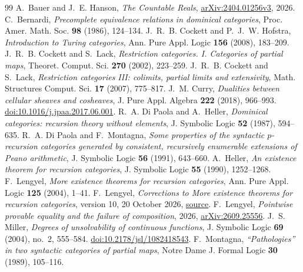 \documentclass[11pt]{article}
\theoremstyle{definition}\newtheorem{definition}[theorem]{Definition}
\begin{document}
\begin{thebibliography}{99}
\small
{}
A.~Bauer and J.~E. Hanson, \emph{The Countable Reals},
\href{https://arxiv.org/abs/2404.01256v3}{arXiv:2404.01256v3}, 2026.
C.~Bernardi, \emph{Precomplete equivalence relations in dominical
categories}, Proc. Amer. Math. Soc. \textbf{98} (1986), 124--134.
J.~R.~B. Cockett and P.~J.~W. Hofstra,
\emph{Introduction to Turing categories},
Ann. Pure Appl. Logic \textbf{156} (2008), 183--209.
J.~R.~B. Cockett and S.~Lack, \emph{Restriction categories. I.
Categories of partial maps}, Theoret. Comput. Sci. \textbf{270}
(2002), 223--259.
J.~R.~B. Cockett and S.~Lack,
\emph{Restriction categories III: colimits, partial limits and extensivity},
Math. Structures Comput. Sci. \textbf{17} (2007), 775--817.
J.~M. Curry, \emph{Dualities between cellular sheaves and cosheaves},
J. Pure Appl. Algebra \textbf{222} (2018), 966--993.
\href{https://doi.org/10.1016/j.jpaa.2017.06.001}
{doi:10.1016/j.jpaa.2017.06.001}.
R.~A. Di Paola and A.~Heller, \emph{Dominical categories:
recursion theory without elements}, J. Symbolic Logic
\textbf{52} (1987), 594--635.
R.~A. Di Paola and F.~Montagna, \emph{Some properties of the syntactic
$p$-recursion categories generated by consistent, recursively enumerable
extensions of Peano arithmetic}, J. Symbolic Logic \textbf{56} (1991),
643--660.
A.~Heller, \emph{An existence theorem for recursion categories},
J. Symbolic Logic \textbf{55} (1990), 1252--1268.
F.~Lengyel, \emph{More existence theorems for recursion categories},
Ann. Pure Appl. Logic \textbf{125} (2004), 1--41.
F.~Lengyel, \emph{Corrections to More existence theorems for recursion
categories}, version 10, 20 October 2026,
\href{https://github.com/flengyel/errata/blob/5555e4fa1da7b8e3a0836dd1fbf1ca385cacd03b/lengyel2004/lengyel2004_repairs_v10.tex}{source}.
F.~Lengyel, \emph{Pointwise provable equality and the failure of
composition}, 2026,
\href{https://arxiv.org/abs/2609.25556}{arXiv:2609.25556}.
J.~S. Miller, \emph{Degrees of unsolvability of continuous functions},
J. Symbolic Logic \textbf{69} (2004), no.~2, 555--584.
\href{https://doi.org/10.2178/jsl/1082418543}{doi:10.2178/jsl/1082418543}.
F.~Montagna, \emph{``Pathologies'' in two syntactic categories of partial
maps}, Notre Dame J. Formal Logic \textbf{30} (1989), 105--116.

\end{thebibliography}
\end{document}
